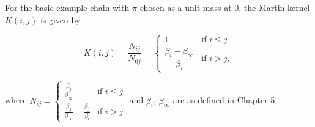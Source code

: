 For the basic example chain with $\pi$ chosen as a unit mass at $0$, the Martin kernel $K(i,j)$ is given by

$$K(i,j) = \frac{N_{ij}}{N_{0j}} = \begin{cases} 1 & \text{if } i \leq j \\[4pt] \dfrac{\beta_i - \beta_\infty}{\beta_i} & \text{if } i > j, \end{cases}$$

where $N_{ij} = \begin{cases} \frac{\beta_j}{\beta_\infty} & \text{if } i \leq j \\ \frac{\beta_j}{\beta_\infty} - \frac{\beta_j}{\beta_i} & \text{if } i > j \end{cases}$ and $\beta_i$, $\beta_\infty$ are as defined in Chapter 5.
